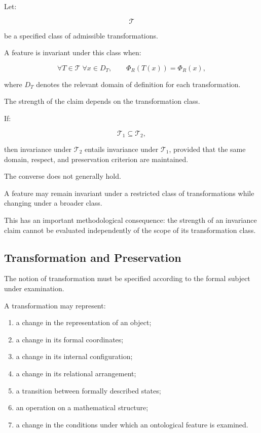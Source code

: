 Let:

\[
    \mathcal{T}
\]

be a specified class of admissible transformations.

A feature is invariant under this class when:

\[
    \forall T \in \mathcal{T}\;
    \forall x \in D_T,\qquad
    \Phi_R(T(x)) = \Phi_R(x),
\]

where \(D_T\) denotes the relevant domain of
definition for each transformation.

The strength of the claim depends on the
transformation class.

If:

\[
    \mathcal{T}_1 \subseteq \mathcal{T}_2,
\]

then invariance under \(\mathcal{T}_2\) entails
invariance under \(\mathcal{T}_1\), provided that
the same domain, respect, and preservation criterion
are maintained.

The converse does not generally hold.

A feature may remain invariant under a restricted
class of transformations while changing under
a broader class.

This has an important methodological consequence:
the strength of an invariance claim cannot be
evaluated independently of the scope of its
transformation class.

\subsection{Transformation and Preservation}

The notion of transformation must be specified
according to the formal subject under examination.

A transformation may represent:

\begin{enumerate}
    \item a change in the representation of an object;
    \item a change in its formal coordinates;
    \item a change in its internal configuration;
    \item a change in its relational arrangement;
    \item a transition between formally described states;
    \item an operation on a mathematical structure;
    \item a change in the conditions under which
    an ontological feature is examined.
\end{enumerate}

